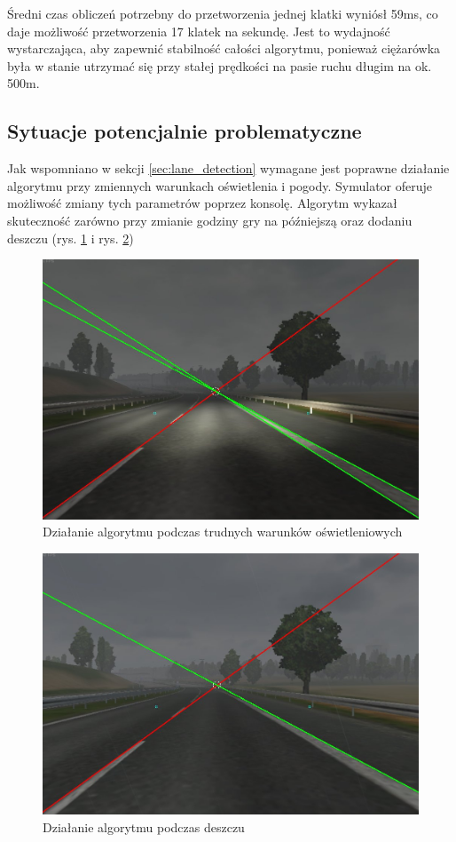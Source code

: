 Średni czas obliczeń potrzebny do przetworzenia jednej klatki wyniósł 59ms, co daje możliwość przetworzenia 17 klatek na sekundę. Jest to wydajność wystarczająca, aby zapewnić stabilność całości algorytmu, ponieważ ciężarówka była w stanie utrzymać się przy stałej prędkości na pasie ruchu długim na ok. 500m.

\subsection{Sytuacje potencjalnie problematyczne}
Jak wspomniano w sekcji \ref{sec:lane_detection} wymagane jest poprawne działanie algorytmu przy zmiennych warunkach oświetlenia i pogody. Symulator oferuje możliwość zmiany tych parametrów poprzez konsolę. Algorytm wykazał skuteczność zarówno przy zmianie godziny gry na późniejszą oraz dodaniu deszczu (rys. \ref{fig:alg1_late} i rys. \ref{fig:alg1_rain})

\begin{figure}
  \centering
  \includegraphics[width=13cm]{img/alg1_late.jpg}
  \caption{Działanie algorytmu podczas trudnych warunków oświetleniowych}
  \label{fig:alg1_late}
\end{figure}

\begin{figure}
  \centering
  \includegraphics[width=13cm]{img/alg1_rain.jpg}
  \caption{Działanie algorytmu podczas deszczu}
  \label{fig:alg1_rain}
\end{figure}

